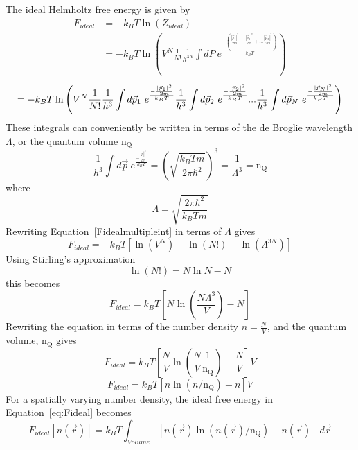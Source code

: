 \documentclass[double,12pt]{beavtex}
\begin{document}
The ideal Helmholtz free energy is given by 
\begin{align}
    F_{ideal} &= -k_{B}T\ln(Z_{ideal}) \\
              &= -k_BT\ln{\left(V^N\frac{1}{N!}\frac{1}{h^{3N}}\int{dP}~e^\frac{-\left(\frac{|\vec{p}_1|^2}{2m}+ \frac{|\vec{p}_2|^2}{2m}+...\frac{|\vec{p}_N|^2}{2m}\right)}{k_BT}\right)} 
\end{align}  
\begin{equation}{\label{Fidealmultipleint}}{=-k_BT\ln\left(V^N\frac{1}{N!}\frac{1}{h^{3}}\int{d\vec{p}_1}~e^\frac{-\frac{|\vec{p}_1|^2}{2m}}{k_BT}\frac{1}{h^{3}}\int{d\vec{p}_2}~e^\frac{-\frac{|\vec{p}_2|^2}{2m}}{k_BT}{...}\frac{1}{h^{3}}\int{d\vec{p}_N}~e^\frac{-\frac{|\vec{p}_N|^2}{2m}}{k_BT}\right)}\end{equation}
These integrals can conveniently be written in terms of the de Broglie 
wavelength $\Lambda$, or the quantum volume $\text{n}_\text{Q}$
\begin{equation}{\frac{1}{h^{3}}\int{d\vec{p}}~e^\frac{-\frac{|\vec{p}|^2}{2m}}{k_BT}=\left(\sqrt{\frac{k_BTm}{2\pi\hbar^2}}\right)^3=\frac{1}{\Lambda^{3}}}=\text{n}_\text{Q}\end{equation} 
where \begin{equation}{\Lambda =\sqrt{\frac{2\pi\hbar^2}{k_BTm}}}\end{equation} 
Rewriting Equation~\ref{Fidealmultipleint} in terms of $\Lambda$ gives
\begin{equation}{F_{ideal}= -k_BT[\ln(V^N)-\ln(N!) - \ln(\Lambda^{3N})]}\end{equation}
Using Stirling's approximation \begin{equation}{\ln(N!)=N\ln{N}-N}\end{equation} 
this becomes
\begin{equation}F_{ideal}= k_BT[N\ln\left(\frac{N\Lambda^{3}}{V}\right)-N]\end{equation} 
Rewriting the equation in terms of the number density $n=\frac{N}{V}$, 
and the quantum volume, $\text{n}_\text{Q}$ gives
\begin{equation}{F_{ideal}= k_BT\left[\frac{N}{V}\ln{\left(\frac{N}{V}\frac{1}{\text{n}_\text{Q}}\right)}-\frac{N}{V}\right]}V\end{equation}
\begin{equation}\label{eq:Fideal}{F_{ideal}= k_BT[n\ln(n/\text{n}_\text{Q})-n]V}\end{equation}   
For a spatially varying number density, the ideal free energy in 
Equation~\ref{eq:Fideal} becomes
\begin{equation}\label{eq:Fideal-n(r)}{F_{ideal}[n(\vec{r})]= k_BT\int_{Volume}[n(\vec{r})\ln(n(\vec{r})/\text{n}_\text{Q})-n(\vec{r})]~d\vec{r}}\end{equation} 
\end{document}
